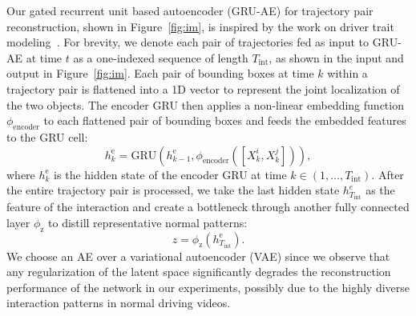 Our gated recurrent unit based autoencoder (GRU-AE) for trajectory pair reconstruction, shown in Figure~\ref{fig:im}, is inspired by the work on driver trait modeling~\citep{liu2022learning}. For brevity, we denote each pair of trajectories fed as input to GRU-AE at time $t$ as a one-indexed sequence of length $T_\text{int}$, as shown in the input and output in Figure~\ref{fig:im}. Each pair of bounding boxes at time $k$ within a trajectory pair is flattened into a 1D vector to represent the joint localization of the two objects. The encoder GRU then applies a non-linear embedding function $\phi_\text{encoder}$ to each flattened pair of bounding boxes and feeds the embedded features to the GRU cell:
\begin{equation}
\label{eq:im-encoder}
h_k^\text{e} = \text{GRU} \left( h_{k-1}^\text{e}, \phi_\text{encoder} ([X_k^i, X_k^j]) \right),
\end{equation}
where $h_k^\text{e}$ is the hidden state of the encoder GRU at time $k \in (1, \dots, T_\text{int})$. After the entire trajectory pair is processed, we take the last hidden state $h_{T_\text{int}}^e$ as the feature of the interaction and create a bottleneck through another fully connected layer $\phi_\text{z}$ to distill representative normal patterns:
\begin{equation}
z = \phi_\text{z} (h_{T_\text{int}}^\text{e}).
\end{equation}
We choose an AE over a variational autoencoder (VAE) since we observe that any regularization of the latent space significantly degrades the reconstruction performance of the network in our experiments, possibly due to the highly diverse interaction patterns in normal driving videos.

